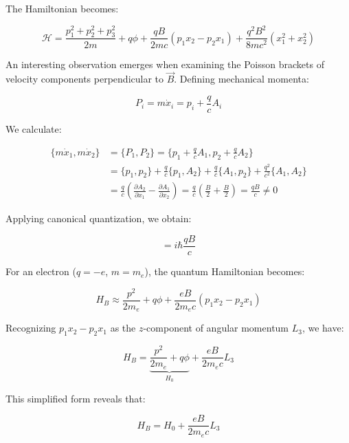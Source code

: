 \documentclass[italian]{HKNdocument}
\begin{document}
The Hamiltonian becomes:

\begin{equation}
\mathcal{H}=\frac{p_{1}^{2}+p_{2}^{2}+p_{3}^{2}}{2m}+q\phi+\frac{qB}{2mc}(p_{1}x_{2}-p_{2}x_{1})+\frac{q^{2}B^{2}}{8mc^{2}}(x_{1}^{2}+x_{2}^{2})
\end{equation}

An interesting observation emerges when examining the Poisson brackets of velocity components perpendicular to $\vec{B}$. Defining mechanical momenta:

\begin{equation}
P_{i}=m\dot{x}_{i}=p_{i}+\frac{q}{c}A_{i}
\end{equation}

We calculate:

\begin{align}
\{m\dot{x}_{1},m\dot{x}_{2}\} &= \{P_{1},P_{2}\}=\{p_{1}+\frac{q}{c}A_{1},p_{2}+\frac{q}{c}A_{2}\}\\
&= \{p_{1},p_{2}\}+\frac{q}{c}\{p_{1},A_{2}\}+\frac{q}{c}\{A_{1},p_{2}\}+\frac{q^{2}}{c^{2}}\{A_{1},A_{2}\}\\
&= \frac{q}{c}(\frac{\partial A_{2}}{\partial x_{1}}-\frac{\partial A_{1}}{\partial x_{2}})=\frac{q}{c}(\frac{B}{2}+\frac{B}{2})=\frac{qB}{c}\neq 0
\end{align}

Applying canonical quantization, we obtain:

\begin{equation}
[P_{1},P_{2}]=i\hbar\frac{qB}{c}
\end{equation}

For an electron ($q=-e$, $m=m_e$), the quantum Hamiltonian becomes:

\begin{equation}
H_{B}\approx\frac{p^{2}}{2m_e}+q\phi+\frac{eB}{2m_e c}(p_{1}x_{2}-p_{2}x_{1})
\end{equation}

Recognizing $p_{1}x_{2}-p_{2}x_{1}$ as the $z$-component of angular momentum $L_3$, we have:

\begin{equation}
H_{B}=\underbrace{\frac{p^{2}}{2m_e}+q\phi}_{H_0}+\frac{eB}{2m_e c}L_3
\end{equation}

This simplified form reveals that:

\begin{equation}
H_{B}=H_0+\frac{eB}{2m_e c}L_3
\end{equation}
\end{document}
